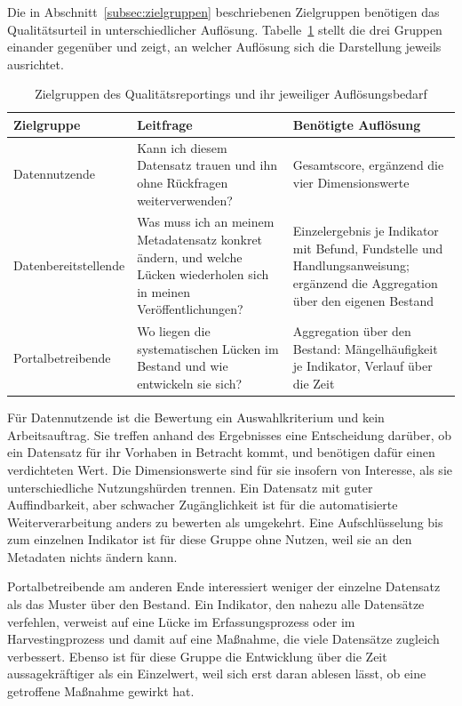 Die in Abschnitt~\ref{subsec:zielgruppen} beschriebenen Zielgruppen benötigen das Qualitätsurteil in unterschiedlicher Auflösung. Tabelle~\ref{tab:zielgruppen} stellt die drei Gruppen einander gegenüber und zeigt, an welcher Auflösung sich die Darstellung jeweils ausrichtet.

\begin{table}[H]
\centering
\tiny
\renewcommand{\arraystretch}{1}
\begin{tabularx}{\textwidth}{p{3cm} X X}
\toprule
\textbf{Zielgruppe} & \textbf{Leitfrage} & \textbf{Benötigte Auflösung} \\
\midrule

Datennutzende &
Kann ich diesem Datensatz trauen und ihn ohne Rückfragen weiterverwenden? &
Gesamtscore, ergänzend die vier Dimensionswerte \\ \hline

Datenbereitstellende &
Was muss ich an meinem Metadatensatz konkret ändern, und welche Lücken wiederholen sich in meinen Veröffentlichungen? &
Einzelergebnis je Indikator mit Befund, Fundstelle und Handlungsanweisung; ergänzend die Aggregation über den eigenen Bestand \\ \hline

Portalbetreibende &
Wo liegen die systematischen Lücken im Bestand und wie entwickeln sie sich? &
Aggregation über den Bestand: Mängelhäufigkeit je Indikator, Verlauf über die Zeit \\

\bottomrule
\end{tabularx}
\captionsetup{justification=centering}
\caption{Zielgruppen des Qualitätsreportings und ihr jeweiliger Auflösungsbedarf}
\label{tab:zielgruppen}
\end{table}

Für Datennutzende ist die Bewertung ein Auswahlkriterium und kein Arbeitsauftrag. Sie treffen anhand des Ergebnisses eine Entscheidung darüber, ob ein Datensatz für ihr Vorhaben in Betracht kommt, und benötigen dafür einen verdichteten Wert. Die Dimensionswerte sind für sie insofern von Interesse, als sie unterschiedliche Nutzungshürden trennen. Ein Datensatz mit guter Auffindbarkeit, aber schwacher Zugänglichkeit ist für die automatisierte Weiterverarbeitung anders zu bewerten als umgekehrt. Eine Aufschlüsselung bis zum einzelnen Indikator ist für diese Gruppe ohne Nutzen, weil sie an den Metadaten nichts ändern kann.

Portalbetreibende am anderen Ende interessiert weniger der einzelne Datensatz als das Muster über den Bestand. Ein Indikator, den nahezu alle Datensätze verfehlen, verweist auf eine Lücke im Erfassungsprozess oder im Harvestingprozess und damit auf eine Maßnahme, die viele Datensätze zugleich verbessert. Ebenso ist für diese Gruppe die Entwicklung über die Zeit aussagekräftiger als ein Einzelwert, weil sich erst daran ablesen lässt, ob eine getroffene Maßnahme gewirkt hat.

